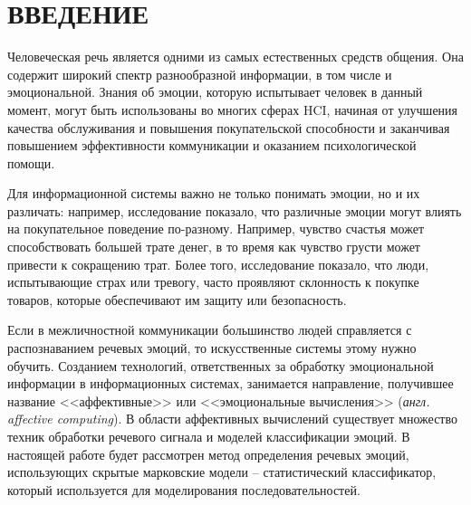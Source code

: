 \part*{ВВЕДЕНИЕ}
Человеческая речь является одними из самых естественных средств общения. Она содержит широкий спектр разнообразной информации, в том числе и эмоциональной. Знания об эмоции, которую испытывает человек в данный момент, могут быть использованы во многих сферах HCI, начиная от улучшения качества обслуживания и повышения покупательской способности и заканчивая повышением эффективности коммуникации и оказанием психологической помощи. 

Для информационной системы важно не только понимать эмоции, но и их различать: например, исследование \cite{hsee2008feeling} показало, что  различные эмоции могут влиять на покупательное поведение по-разному. Например, чувство счастья может способствовать большей трате денег, в то время как чувство грусти может привести к сокращению трат. Более того, исследование показало, что люди, испытывающие страх или тревогу, часто проявляют склонность к покупке товаров, которые обеспечивают им защиту или безопасность.

Если в межличностной коммуникации большинство людей справляется с распознаванием речевых эмоций, то искусственные системы этому нужно обучить. Созданием технологий, ответственных за обработку эмоциональной информации в информационных системах, занимается направление, получившее название <<аффективные>> или <<эмоциональные вычисления>> (\textit{англ. affective computing}). В области аффективных вычислений существует множество техник обработки речевого сигнала и моделей классификации эмоций. В настоящей работе будет рассмотрен метод определения речевых эмоций, использующих скрытые марковские модели -- статистический классификатор, который используется для моделирования последовательностей. 